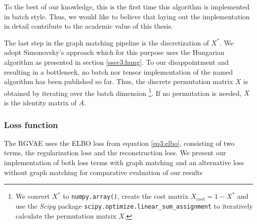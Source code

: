 To the best of our knowledge, this is the first time this algorithm is implemented in batch style. Thus, we would like to believe that laying out the implementation in detail contribute to the academic value of this thesis.  

The last step in the graph matching pipeline is the discretization of $X^*$. We adopt Simonovsky's \cite{simonovsky_graphvae_2018} approach which for this purpose uses the Hungarian algorithm as presented in section \ref{ssec3:hung}. To our disappointment and resulting in a bottleneck, no batch nor tensor implementation of the named algorithm has been published so far. Thus, the discrete permutation matrix $X$ is obtained by iterating over the batch dimension \footnote{We convert $X^*$ to \texttt{numpy.array()}, create the cost matrix $X_{cost} = 1 - X^*$ and use the \textit{Scipy} package \cite{2020SciPy-NMeth} \texttt{scipy.optimize.linear\_sum\_assignment} to iteratively calculate the permutation matrix $X$.}. If no permutation is needed, $X$ is the identity matrix of $A$. 



\subsubsection{Loss function}
\label{ssec4:loss}

The RGVAE uses the ELBO loss from equation \ref{eq3:elbo}, consisting of two terms, the regularization loss and the reconstruction loss. We present our implementation of both loss terms with graph matching and an alternative loss without graph matching for comparative evaluation of our results 


